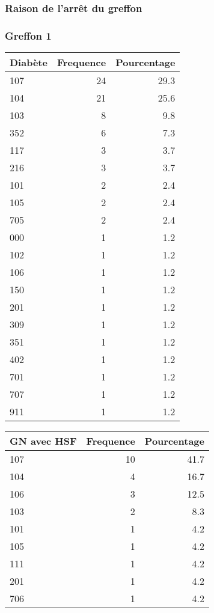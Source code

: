 \documentclass[11pt,a4paper]{article}\usepackage[]{graphicx}\usepackage[]{color}
\begin{document}
    \subsubsection{Raison de l'arrêt du greffon}

\subsubsection*{Greffon 1}

\begin{table}[H]
\centering
\begin{tabular}{lrr}
  \hline
Diabète & Frequence & Pourcentage \\ 
  \hline
107 & 24 & 29.3 \\ 
  104 & 21 & 25.6 \\ 
  103 & 8 & 9.8 \\ 
  352 & 6 & 7.3 \\ 
  117 & 3 & 3.7 \\ 
  216 & 3 & 3.7 \\ 
  101 & 2 & 2.4 \\ 
  105 & 2 & 2.4 \\ 
  705 & 2 & 2.4 \\ 
  000 & 1 & 1.2 \\ 
  102 & 1 & 1.2 \\ 
  106 & 1 & 1.2 \\ 
  150 & 1 & 1.2 \\ 
  201 & 1 & 1.2 \\ 
  309 & 1 & 1.2 \\ 
  351 & 1 & 1.2 \\ 
  402 & 1 & 1.2 \\ 
  701 & 1 & 1.2 \\ 
  707 & 1 & 1.2 \\ 
  911 & 1 & 1.2 \\ 
   \hline
\end{tabular}
\end{table}
\begin{table}[H]
\centering
\begin{tabular}{lrr}
  \hline
GN avec HSF & Frequence & Pourcentage \\ 
  \hline
107 & 10 & 41.7 \\ 
  104 & 4 & 16.7 \\ 
  106 & 3 & 12.5 \\ 
  103 & 2 & 8.3 \\ 
  101 & 1 & 4.2 \\ 
  105 & 1 & 4.2 \\ 
  111 & 1 & 4.2 \\ 
  201 & 1 & 4.2 \\ 
  706 & 1 & 4.2 \\ 
   \hline
\end{tabular}
\end{table}
\end{document}
